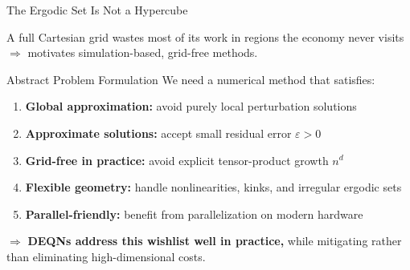 \documentclass[aspectratio=169,11pt]{beamer}
\newcommand{\emphc}[1]{\textcolor{harvardcrimson}{#1}}
\begin{document}
\begin{frame}{The Ergodic Set Is Not a Hypercube}
\begin{center}
\end{center}

\vspace{-0.3em}
\begin{center}
{\footnotesize A full Cartesian grid \emphc{wastes} most of its work in regions the economy never visits $\Rightarrow$ motivates \emphc{simulation-based, grid-free} methods.}
\end{center}
\end{frame}

\begin{frame}{Abstract Problem Formulation}
We need a numerical method that satisfies:

\vspace{0.4em}
\begin{enumerate}
    \item \textbf{Global approximation:} avoid purely local perturbation solutions
    \item \textbf{Approximate solutions:} accept small residual error $\varepsilon > 0$
    \item \textbf{Grid-free in practice:} avoid explicit tensor-product growth $n^d$
    \item \textbf{Flexible geometry:} handle nonlinearities, kinks, and irregular ergodic sets
    \item \textbf{Parallel-friendly:} benefit from \emphc{parallelization} on modern hardware
\end{enumerate}

\vspace{0.6em}
\begin{center}
$\Rightarrow$ \textbf{DEQNs address this wishlist well in practice,}
while \emphc{mitigating} rather than eliminating high-dimensional costs.
\end{center}
\end{frame}
\end{document}
